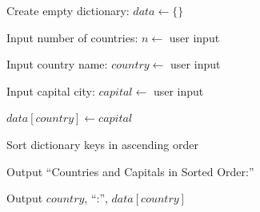 \begin{algorithm}
\caption{Store and Display Countries with Capitals in Sorted Order}
\begin{algorithmic}[1]

\STATE Create empty dictionary:
\STATE $data \gets \{\}$

\STATE Input number of countries:
\STATE $n \gets$ user input


    \STATE Input country name:
    \STATE $country \gets$ user input

    \STATE Input capital city:
    \STATE $capital \gets$ user input

    \STATE $data[country] \gets capital$

\ENDFOR

\STATE Sort dictionary keys in ascending order

\STATE Output ``Countries and Capitals in Sorted Order:''

    \STATE Output $country$, ``:'', $data[country]$
\ENDFOR

\end{algorithmic}
\end{algorithm}